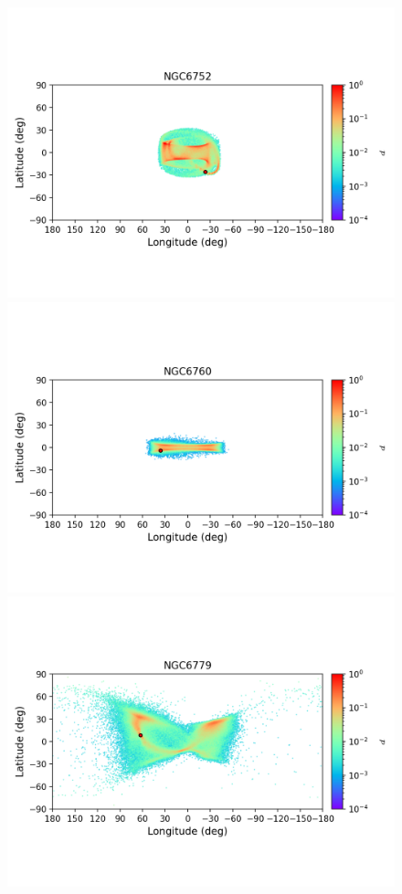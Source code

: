 \begin{figure}
        \includegraphics[clip=true, trim = 0mm 20mm 0mm 10mm, width=1\columnwidth]{images/error_plots_NGC6752.png}
        \includegraphics[clip=true, trim = 0mm 20mm 0mm 10mm, width=1\columnwidth]{images/error_plots_NGC6760.png}
        \includegraphics[clip=true, trim = 0mm 20mm 0mm 10mm, width=1\columnwidth]{images/error_plots_NGC6779.png}

\end{figure}
